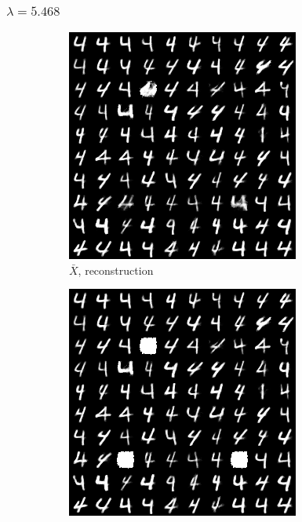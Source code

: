 \documentclass{beamer}
\theoremstyle{plain}
\theoremstyle{definition}
\theoremstyle{remark}
\begin{document}
\begin{frame}
	\frametitle{$\lambda=5.468$}
	\begin{figure}
		\centering
		\begin{subfigure}[b]{0.3\textwidth}
			\centering
			\includegraphics[width=\textwidth]{Images/l21R_5.468.png}
			\caption{$\bar{X}$, reconstruction}
		\end{subfigure}
		\hfill
		\begin{subfigure}[b]{0.3\textwidth}
			\centering
			\includegraphics[width=\textwidth]{Images/l21L_5.468.png}

\end{subfigure}
\end{figure}
\end{frame}
\end{document}
